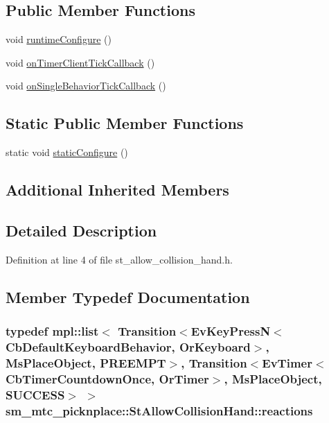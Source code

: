 \subsection*{Public Member Functions}
\begin{DoxyCompactItemize}
\item 
void \hyperlink{structsm__mtc__picknplace_1_1StAllowCollisionHand_a60077620e1e1c5fc54732a2aae2844ef}{runtime\+Configure} ()
\item 
void \hyperlink{structsm__mtc__picknplace_1_1StAllowCollisionHand_a2bdb0aec48af81da55f91a486d8f4559}{on\+Timer\+Client\+Tick\+Callback} ()
\item 
void \hyperlink{structsm__mtc__picknplace_1_1StAllowCollisionHand_a613e974b8c3070c6d8602b5628eaabb2}{on\+Single\+Behavior\+Tick\+Callback} ()
\end{DoxyCompactItemize}
\subsection*{Static Public Member Functions}
\begin{DoxyCompactItemize}
\item 
static void \hyperlink{structsm__mtc__picknplace_1_1StAllowCollisionHand_a2677cfe7091c94d3e7cd5ba0af4e52af}{static\+Configure} ()
\end{DoxyCompactItemize}
\subsection*{Additional Inherited Members}


\subsection{Detailed Description}


Definition at line 4 of file st\+\_\+allow\+\_\+collision\+\_\+hand.\+h.



\subsection{Member Typedef Documentation}
\subsubsection[{\texorpdfstring{reactions}{reactions}}]{\setlength{\rightskip}{0pt plus 5cm}typedef mpl\+::list$<$ Transition$<$Ev\+Key\+PressN$<$Cb\+Default\+Keyboard\+Behavior, {\bf Or\+Keyboard}$>$, {\bf Ms\+Place\+Object}, {\bf P\+R\+E\+E\+M\+PT}$>$, Transition$<$Ev\+Timer$<$Cb\+Timer\+Countdown\+Once, {\bf Or\+Timer}$>$, {\bf Ms\+Place\+Object}, {\bf S\+U\+C\+C\+E\+SS}$>$ $>$ {\bf sm\+\_\+mtc\+\_\+picknplace\+::\+St\+Allow\+Collision\+Hand\+::reactions}}\hypertarget{structsm__mtc__picknplace_1_1StAllowCollisionHand_ad22af576c12391c49d7af25689b33478}{}\label{structsm__mtc__picknplace_1_1StAllowCollisionHand_ad22af576c12391c49d7af25689b33478}


